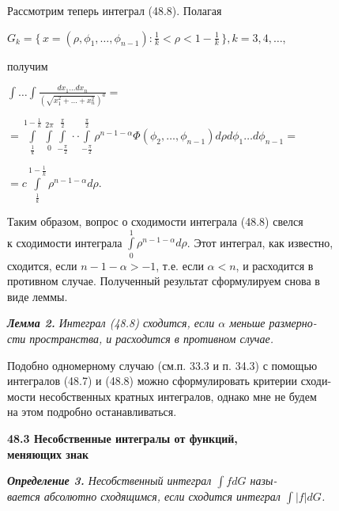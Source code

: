 ﻿\documentclass[twocolumn]{article}
\begin{document}
\hspace{5pt} Рассмотрим теперь интеграл (48.8). Полагая
\begin{center}
$G_k = \{\,x = (\rho,\phi_1,\ldots,\phi_{n-1}):\frac1k < \rho < 1 - \frac1k\,\}, k = 3,4,\ldots$,
\end{center}
получим
\begin{center}
$\int \ldots \int\frac{dx_1\ldots dx_n}{(\sqrt{x^2_1+\ldots +x^2_n})^a} = $
\end{center}
\begin{center}
$= \int\limits^{1-\frac1k}_{\frac1k}\int\limits_0^{2\pi}\int\limits_{-\frac{\pi}{2}}^{\frac{\pi}{2}}\cdot \cdot \int\limits_{-\frac{\pi}{2}}^{\frac{\pi}{2}}\rho^{n-1-\alpha}\Phi(\phi_2,\ldots,\phi_{n-1})d\rho d\phi_1\ldots d\phi_{n-1} =$
\end{center}
\begin{center}
$= c \int\limits^{1-\frac1k}_{\frac1k} \rho^{n-1-\alpha}d\rho$.
\end{center}
\hspace{5pt} Таким образом, вопрос о сходимости интеграла (48.8) свелся\\ к сходимости интеграла $\int\limits_0^1 \rho^{n-1-\alpha}d\rho$. Этот интеграл, как известно,\\ сходится, если $n - 1 - \alpha > -1$, т.е. если $\alpha < n$, и расходится в\\ противном случае. Полученный результат сформулируем снова в\\ виде леммы.

{\slshape{{\bfseries\slshape{Лемма 2.}} Интеграл (48.8) сходится, если $\alpha$
меньше размерно-\\сти пространства, и расходится в противном случае.}}

Подобно одномерному случаю (см.п. 33.3 и п. 34.3) с помощью\\ интегралов (48.7) и (48.8) можно сформулировать 
критерии сходи-\\мости несобственных кратных интегралов, однако мне не будем\\ на этом подробно останавливаться.


\begin{flushleft}
{\small{\bfseries\hspace{30pt} 48.3 Несобственные интегралы от функций,\\
\hspace{30pt} меняющих знак}}
\end{flushleft}
{\slshape{\bfseries\slshape{\hspace{30pt} Определение 3.}} Несобственный интеграл $\int fdG $ назы-\\вается абсолютно сходящимся, если сходится интеграл $\int |f|dG $.}
\end{document}
